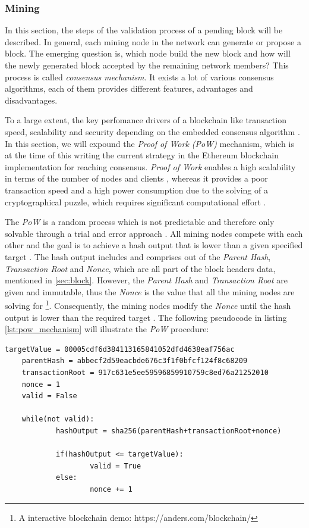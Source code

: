 \subsubsection{Mining}
\label{sec:mining}
In this section, the steps of the validation process of a pending block will be described. 
In general, each mining node in the network can generate or propose a block. 
The emerging question is, which node build the new block and how will the newly 
generated block accepted by the remaining network members? 
This process is called \textit{consensus mechanism}.
It exists a lot of various consensus algorithms, each of them provides different features,
advantages and disadvantages. 

To a large extent, the key perfomance drivers of a blockchain
like transaction speed, scalability and security depending on the embedded consensus algorithm . 
In this section, we will expound the \textit{Proof of Work (PoW)} mechanism, 
which is at the time of this writing the current strategy in the Ethereum blockchain 
implementation for reaching consensus. 
\textit{Proof of Work} enables a high scalability in terms of the number 
of nodes and clients , whereas it provides a poor transaction speed and a high 
power consumption due to the solving of a cryptographical puzzle, which requires 
significant computational effort . 

The \textit{PoW} is a random process which is not predictable and therefore only solvable through a 
trial and error approach . 
All mining nodes compete with each other and the goal is to achieve a hash output that 
is lower than a given specified target .
The hash output includes and comprises out of the \textit{Parent Hash}, \textit{Transaction Root} and
\textit{Nonce}, which are all part of the block headers data, mentioned in \ref{sec:block}.
However, the \textit{Parent Hash} and \textit{Transaction Root} are given and immutable, thus the \textit{Nonce}
is the value that all the mining nodes are solving for \footnote{A interactive blockchain demo: https://anders.com/blockchain/}.
Consequently, the mining nodes modify the \textit{Nonce} until the hash output is lower than the required target .
The following pseudocode in listing \ref{lst:pow_mechanism} will illustrate the \textit{PoW} procedure:

\vspace{7mm}
\begin{lstlisting}[label={lst:pow_mechanism}, caption={Pseudocode for PoW mechanism}]
	targetValue = 00005cdf6d384113165841052dfd4638eaf756ac
	parentHash = abbecf2d59eacbde676c3f1f0bfcf124f8c68209
	transactionRoot = 917c631e5ee59596859910759c8ed76a21252010
	nonce = 1
	valid = False

	while(not valid):
			hashOutput = sha256(parentHash+transactionRoot+nonce)
		
			if(hashOutput <= targetValue):
					valid = True
			else:
					nonce += 1

\end{lstlisting}
\clearpage

